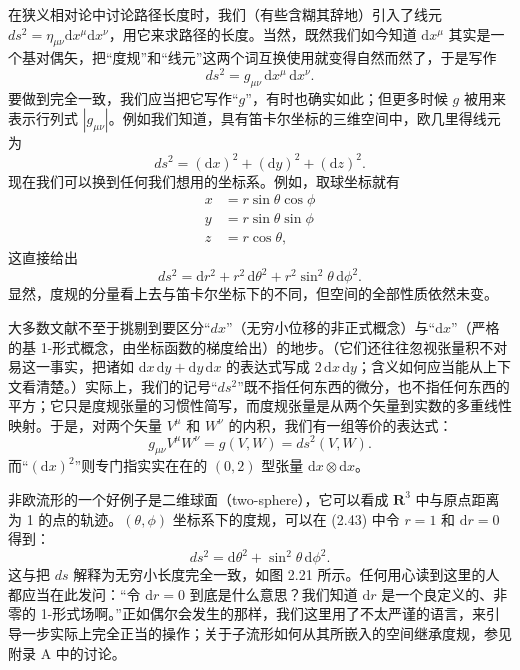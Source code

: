 在狭义相对论中讨论路径长度时，我们（有些含糊其辞地）引入了线元 $ds^2=\eta_{\mu\nu}\mathrm{d}x^\mu\mathrm{d}x^\nu$，用它来求路径的长度。当然，既然我们如今知道 $\mathrm{d}x^\mu$ 其实是一个基对偶矢，把“度规”和“线元”这两个词互换使用就变得自然而然了，于是写作
\begin{equation*}
ds^2=g_{\mu\nu}\,\mathrm{d}x^\mu\,\mathrm{d}x^\nu. \tag{2.40}
\end{equation*}
要做到完全一致，我们应当把它写作“$g$”，有时也确实如此；但更多时候 $g$ 被用来表示行列式 $|g_{\mu\nu}|$。例如我们知道，具有笛卡尔坐标的三维空间中，欧几里得线元为
\begin{equation*}
ds^2=(\mathrm{d}x)^2+(\mathrm{d}y)^2+(\mathrm{d}z)^2. \tag{2.41}
\end{equation*}
现在我们可以换到任何我们想用的坐标系。例如，取球坐标就有
\begin{align*}
x&=r\sin\theta\cos\phi\\
y&=r\sin\theta\sin\phi\\
z&=r\cos\theta, \tag{2.42}
\end{align*}
这直接给出
\begin{equation*}
ds^2=\mathrm{d}r^2+r^2\,\mathrm{d}\theta^2+r^2\sin^2\theta\,\mathrm{d}\phi^2. \tag{2.43}
\end{equation*}
显然，度规的分量看上去与笛卡尔坐标下的不同，但空间的全部性质依然未变。

大多数文献不至于挑剔到要区分“$dx$”（无穷小位移的非正式概念）与“$\mathrm{d}x$”（严格的基 1-形式概念，由坐标函数的梯度给出）的地步。（它们还往往忽视张量积不对易这一事实，把诸如 $\mathrm{d}x\,\mathrm{d}y+\mathrm{d}y\,\mathrm{d}x$ 的表达式写成 $2\,\mathrm{d}x\,\mathrm{d}y$；含义如何应当能从上下文看清楚。）实际上，我们的记号“$ds^2$”既不指任何东西的微分，也不指任何东西的平方；它只是度规张量的习惯性简写，而度规张量是从两个矢量到实数的多重线性映射。于是，对两个矢量 $V^\mu$ 和 $W^\nu$ 的内积，我们有一组等价的表达式：
\begin{equation*}
g_{\mu\nu}V^\mu W^\nu=g(V,W)=ds^2(V,W). \tag{2.44}
\end{equation*}
而“$(\mathrm{d}x)^2$”则专门指实实在在的 $(0,2)$ 型张量 $\mathrm{d}x\otimes\mathrm{d}x$。

非欧流形的一个好例子是二维球面（two-sphere），它可以看成 $\mathbf{R}^3$ 中与原点距离为 1 的点的轨迹。$(\theta,\phi)$ 坐标系下的度规，可以在 (2.43) 中令 $r=1$ 和 $\mathrm{d}r=0$ 得到：
\begin{equation*}
ds^2=\mathrm{d}\theta^2+\sin^2\theta\,\mathrm{d}\phi^2. \tag{2.45}
\end{equation*}
这与把 $ds$ 解释为无穷小长度完全一致，如图 2.21 所示。任何用心读到这里的人都应当在此发问：“令 $\mathrm{d}r=0$ 到底是什么意思？我们知道 $\mathrm{d}r$ 是一个良定义的、非零的 1-形式场啊。”正如偶尔会发生的那样，我们这里用了不太严谨的语言，来引导一步实际上完全正当的操作；关于子流形如何从其所嵌入的空间继承度规，参见附录 A 中的讨论。

